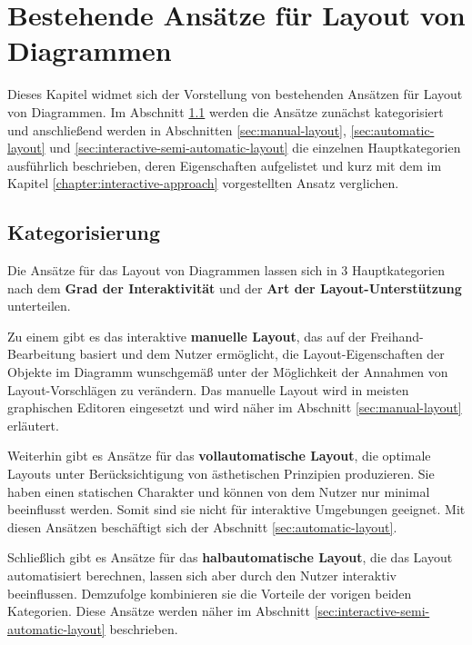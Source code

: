 
\chapter{Bestehende Ansätze für Layout von Diagrammen}
\label{chapter:existing-approaches}

Dieses Kapitel widmet sich der Vorstellung von bestehenden Ansätzen für Layout von Diagrammen. Im Abschnitt \ref{sec:categorization} werden die Ansätze zunächst kategorisiert und anschließend werden in Abschnitten \ref{sec:manual-layout}, \ref{sec:automatic-layout} und \ref{sec:interactive-semi-automatic-layout} die einzelnen Hauptkategorien ausführlich beschrieben, deren Eigenschaften aufgelistet und kurz mit dem im Kapitel \ref{chapter:interactive-approach} vorgestellten Ansatz verglichen.

\section{Kategorisierung}
\label{sec:categorization}

Die Ansätze für das Layout von Diagrammen lassen sich in 3 Hauptkategorien nach dem \textbf{Grad der Interaktivität} und der \textbf{Art der Layout-Unterstützung} unterteilen.

Zu einem gibt es das interaktive \textbf{manuelle Layout}, das auf der Freihand-Bearbeitung basiert und dem Nutzer ermöglicht, die Layout-Eigenschaften der Objekte im Diagramm wunschgemäß unter der Möglichkeit der Annahmen von Layout-Vorschlägen zu verändern. Das manuelle Layout wird in meisten graphischen Editoren eingesetzt und wird näher im Abschnitt \ref{sec:manual-layout} erläutert.

Weiterhin gibt es Ansätze für das \textbf{vollautomatische Layout}, die optimale Layouts unter Berücksichtigung von ästhetischen Prinzipien produzieren. Sie haben einen statischen Charakter und können von dem Nutzer nur minimal beeinflusst werden. Somit sind sie nicht für interaktive Umgebungen geeignet. Mit diesen Ansätzen beschäftigt sich der Abschnitt \ref{sec:automatic-layout}.

Schließlich gibt es Ansätze für das \textbf{halbautomatische Layout}, die das Layout automatisiert berechnen, lassen sich aber durch den Nutzer interaktiv beeinflussen. Demzufolge kombinieren sie die Vorteile der vorigen beiden Kategorien. Diese Ansätze werden näher im Abschnitt \ref{sec:interactive-semi-automatic-layout} beschrieben.

